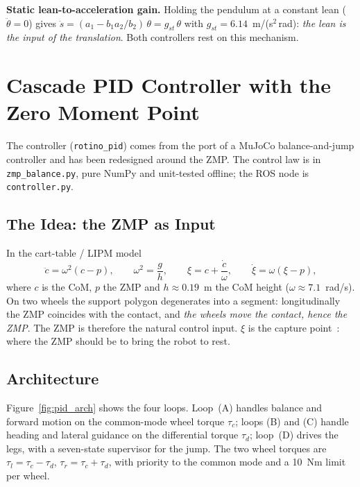 \documentclass[11pt,a4paper]{article}
\begin{document}
\textbf{Static lean-to-acceleration gain.}  Holding the pendulum at a constant lean
($\ddot\theta = 0$) gives $\ddot s = (a_1 - b_1a_2/b_2)\,\theta = g_{st}\,\theta$ with
$g_{st} = 6.14$~m/(s$^2$\,rad): \emph{the lean is the input of the translation}.  Both
controllers rest on this mechanism.


\section{Cascade PID Controller with the Zero Moment Point}
\label{sec:pid}

The controller (\texttt{rotino\_pid}) comes from the port of a MuJoCo balance-and-jump
controller and has been redesigned around the ZMP.  The control law is in
\texttt{zmp\_balance.py}, pure NumPy and unit-tested offline; the ROS node is
\texttt{controller.py}.

\subsection{The Idea: the ZMP as Input}

In the cart-table / LIPM model~\cite{kajita2003}
\begin{equation}
    \ddot c = \omega^2(c-p),\qquad \omega^2=\frac{g}{h},\qquad
    \xi = c + \frac{\dot c}{\omega},\qquad \dot\xi = \omega(\xi-p),
\end{equation}
where $c$ is the CoM, $p$ the ZMP and $h \approx 0.19$~m the CoM height
($\omega \approx 7.1$~rad/s).  On two wheels the support polygon degenerates into a segment:
longitudinally the ZMP coincides with the contact, and \emph{the wheels move the contact, hence
the ZMP}.  The ZMP is therefore the natural control input.  $\xi$ is the capture
point~\cite{englsberger2011}: where the ZMP should be to bring the robot to rest.

\subsection{Architecture}

Figure~\ref{fig:pid_arch} shows the four loops.  Loop~(A) handles balance and forward motion
on the common-mode wheel torque $\tau_c$; loops (B) and (C) handle heading and lateral guidance
on the differential torque $\tau_d$; loop~(D) drives the legs, with a seven-state supervisor
for the jump.  The two wheel torques are $\tau_l = \tau_c - \tau_d$, $\tau_r = \tau_c + \tau_d$,
with priority to the common mode and a 10~Nm limit per wheel.
\end{document}
